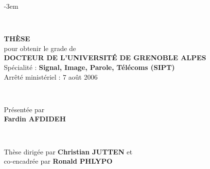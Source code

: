 
\begingroup
\fontsize{13pt}{13pt}\selectfont

\AddToShipoutPicture*{\BackgroundPic}
\def\leftshift{0.82\textwidth}
\def\espvert{0.25cm}
\setlength{\parskip}{0pt}

\begin{titlepage}
\begin{adjustwidth}{}{-3em}
\begin{flushleft}

~~

\vfill

\begin{flushright}
\begin{minipage}{\leftshift}
\begin{flushleft}
\textsc{\Large \bf THÈSE}\\[\espvert]
{pour obtenir le grade de}\\[\espvert]
\textsc{\Large \bf DOCTEUR DE L'UNIVERSITÉ DE GRENOBLE ALPES}\\[\espvert]
{Spécialité : \textbf{Signal, Image, Parole, Télécoms (SIPT)}}\\[\espvert]
{Arrêté ministériel : 7 août 2006}
\end{flushleft}
\end{minipage}
\end{flushright}~~\\[0.75cm]

\vfill

\begin{flushright}
\begin{minipage}{\leftshift}
\begin{flushleft}
{Présentée par}\\
{\Large \textbf{Fardin AFDIDEH}}
\end{flushleft}
\end{minipage}
\end{flushright}~~\\[0.75cm]

\vfill

\begin{flushright}
\begin{minipage}{\leftshift}
\begin{flushleft}
{Thèse dirigée par \textbf{Christian JUTTEN} et\\co-encadrée par \textbf{Ronald PHLYPO}}
\end{flushleft}
\end{minipage}
\end{flushright}


\end{flushleft}
\end{adjustwidth}
\end{titlepage}
